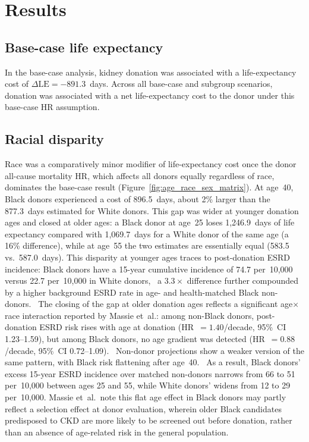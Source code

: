 \section{Results}
\label{sec:results}

\subsection{Base-case life expectancy}
In the base-case analysis, kidney donation was associated with a life-expectancy cost of $\Delta\text{LE} = -891.3$~days. Across all base-case and subgroup scenarios, donation was associated with a net life-expectancy cost to the donor under this base-case HR assumption.

\subsection{Racial disparity}
Race was a comparatively minor modifier of life-expectancy cost once the donor all-cause mortality HR, which affects all donors equally regardless of race, dominates the base-case result (Figure~\ref{fig:age_race_sex_matrix}). At age~40, Black donors experienced a cost of 896.5~days, about 2\% larger than the 877.3~days estimated for White donors. This gap was wider at younger donation ages and closed at older ages: a Black donor at age~25 loses 1{,}246.9~days of life expectancy compared with 1{,}069.7~days for a White donor of the same age (a 16\% difference), while at age~55 the two estimates are essentially equal (583.5 vs.\ 587.0~days). This disparity at younger ages traces to post-donation ESRD incidence: Black donors have a 15-year cumulative incidence of 74.7 per~10,000 versus 22.7 per~10,000 in White donors,~\cite{muzaale_risk_2014} a $3.3\times$ difference further compounded by a higher background ESRD rate in age- and health-matched Black non-donors.~\cite{grams_kidney-failure_2016} The closing of the gap at older donation ages reflects a significant age$\times$race interaction reported by Massie et~al.: among non-Black donors, post-donation ESRD risk rises with age at donation (HR~$=1.40$/decade, 95\%~CI 1.23--1.59), but among Black donors, no age gradient was detected (HR~$=0.88$/decade, 95\%~CI 0.72--1.09).~\cite{massie_quantifying_2017} Non-donor projections show a weaker version of the same pattern, with Black risk flattening after age~40.~\cite{grams_kidney-failure_2016} As a result, Black donors' excess 15-year ESRD incidence over matched non-donors narrows from 66 to 51 per~10,000 between ages 25 and 55, while White donors' widens from 12 to 29 per~10,000. Massie et~al.\ note this flat age effect in Black donors may partly reflect a selection effect at donor evaluation, wherein older Black candidates predisposed to CKD are more likely to be screened out before donation, rather than an absence of age-related risk in the general population.~\cite{massie_quantifying_2017}

